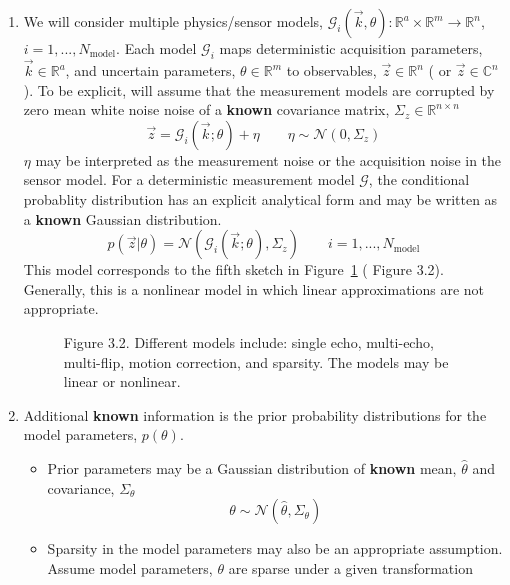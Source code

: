 \documentclass[10pt]{amsart}
\newcommand{\picdir}{./pdffig}
\begin{document}
\begin{enumerate}
  \item We will consider multiple physics/sensor models,
$\mathcal{G}_i(\vec{k},\theta): \mathbb{R}^a
\times \mathbb{R}^m \rightarrow \mathbb{R}^n $, $i=1,..., N_\text{model}$.
Each model $\mathcal{G}_i$ maps deterministic acquisition
parameters, $\vec{k} \in \mathbb{R}^a$, and uncertain parameters, $\theta \in \mathbb{R}^m$
to observables, $\vec{z} \in \mathbb{R}^n$ ( or $\vec{z} \in \mathbb{C}^n$).
To be explicit, will assume that the
measurement models are corrupted by zero mean white noise noise of a
\textbf{known} covariance matrix, $\Sigma_z \in \mathbb{R}^{n \times n}$ 
\begin{equation}
\label{sensormodelstructure}
    \vec{z} = \mathcal{G}_i(\vec{k};\theta) + \eta   \qquad   \eta \sim \mathcal{N}(0,\Sigma_z) 
\end{equation}
$\eta$ may be interpreted as the measurement noise or the acquisition noise
in the sensor model. For a deterministic measurement model $\mathcal{G}$,
the conditional probablity distribution has an explicit analytical form
and may be written as a  \textbf{known} Gaussian
distribution. 
  \[
      p(\vec{z}|\theta) =  \mathcal{N}(\mathcal{G}_i(\vec{k};\theta),\Sigma_z)  \qquad 
                                                           i=1,..., N_\text{model}
  \]
This model corresponds to the fifth sketch in
Figure~\ref{InverseProblemSummary} (\cite{tarantola05} Figure 3.2). 
Generally, this is a nonlinear model in 
which linear approximations are not appropriate.
\begin{figure}[h]
\centering
{}
\caption{\cite{tarantola05} Figure 3.2.
     Different models include: single echo, multi-echo, multi-flip,
motion correction, and sparsity. The models may be linear or nonlinear.
} \label{InverseProblemSummary}
\end{figure}
  \item Additional \textbf{known} information is the prior probability
distributions for the model parameters, $p(\theta)$. 
   \begin{itemize}
    \item Prior parameters may be a Gaussian distribution of 
   \textbf{known} mean, $\hat{\theta}$ and covariance, $\Sigma_\theta$
   \[
      \theta \sim \mathcal{N} (\hat{\theta}, \Sigma_\theta)
   \]
    \item Sparsity in the model parameters may also be an appropriate assumption.
Assume model parameters, $\theta$ are sparse under a given transformation

\end{itemize}
\end{enumerate}
\end{document}
